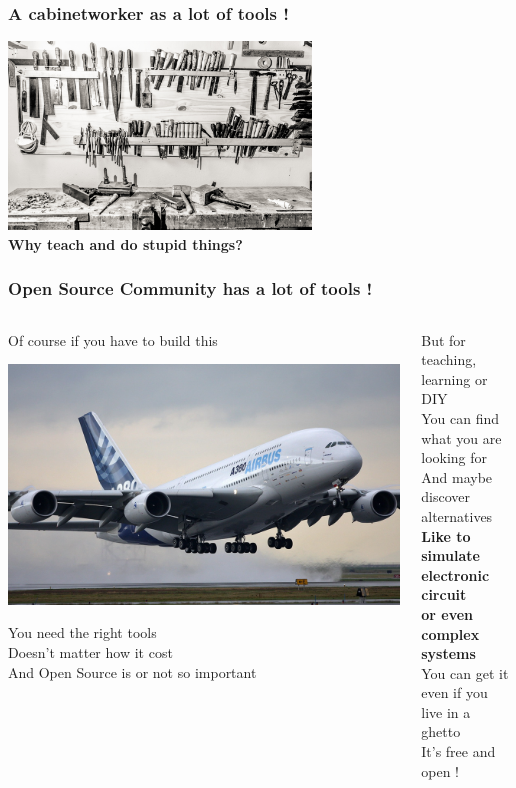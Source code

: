\begin{frame}
  \frametitle{A cabinetworker as a lot of tools !}
  \begin{center}
    \includegraphics[height=5cm]{images/ebeniste.jpg} \\[1em]
    \textbf{Why teach and do stupid things?}
  \end{center}
\end{frame}

\begin{frame}
  \frametitle{Open Source Community has a lot of tools !}
  \begin{columns}[T]
    \begin{column}{.5\textwidth}
      Of course if you have to build this \\[1em]
      \begin{center}
        \includegraphics[width=.8\textwidth]{images/airbus-land-off.jpg} \\[1em]
      \end{center}
      You need the right tools \\
      Doesn't matter how it cost \\
      And Open Source is or not so important
    \end{column}
    \begin{column}{.5\textwidth}
      But for teaching, learning or DIY \\[1em]
      You can find what you are looking for \\
      And maybe discover alternatives \\[1em]
      \textbf{Like to simulate electronic circuit \\
        or even complex systems} \\[1em]
      You can get it \\
      even if you live in a ghetto \\
      It's free and open !
    \end{column}
  \end{columns}
\end{frame}

